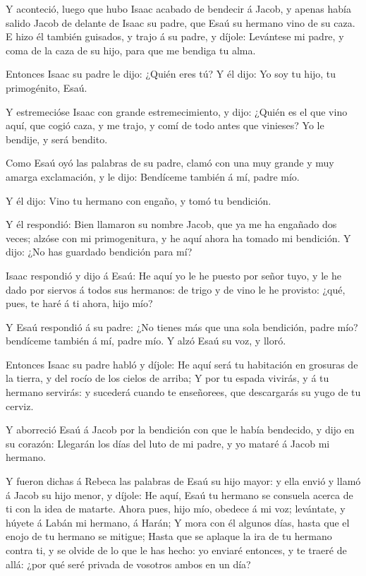  Y aconteció, luego que hubo Isaac acabado de bendecir á
Jacob, y apenas había salido Jacob de delante de Isaac su padre, que
Esaú su hermano vino de su caza.  E hizo él también
guisados, y trajo á su padre, y díjole: Levántese mi padre, y coma de la
caza de su hijo, para que me bendiga tu alma.

 Entonces Isaac su padre le dijo: ¿Quién eres tú? Y él
dijo: Yo soy tu hijo, tu primogénito, Esaú.

 Y estremecióse Isaac con grande estremecimiento, y dijo:
¿Quién es el que vino aquí, que cogió caza, y me trajo, y comí de todo
antes que vinieses? Yo le bendije, y será bendito.

 Como Esaú oyó las palabras de su padre, clamó con una muy
grande y muy amarga exclamación, y le dijo: Bendíceme también á mí,
padre mío.

 Y él dijo: Vino tu hermano con engaño, y tomó tu
bendición.

 Y él respondió: Bien llamaron su nombre Jacob, que ya me
ha engañado dos veces; alzóse con mi primogenitura, y he aquí ahora ha
tomado mi bendición. Y dijo: ¿No has guardado bendición para mí?

 Isaac respondió y dijo á Esaú: He aquí yo le he puesto por
señor tuyo, y le he dado por siervos á todos sus hermanos: de trigo y de
vino le he provisto: ¿qué, pues, te haré á ti ahora, hijo mío?

 Y Esaú respondió á su padre: ¿No tienes más que una sola
bendición, padre mío? bendíceme también á mí, padre mío. Y alzó Esaú su
voz, y lloró.

 Entonces Isaac su padre habló y díjole: He aquí será tu
habitación en grosuras de la tierra, y del rocío de los cielos de
arriba;  Y por tu espada vivirás, y á tu hermano servirás:
y sucederá cuando te enseñorees, que descargarás su yugo de tu cerviz.

 Y aborreció Esaú á Jacob por la bendición con que le había
bendecido, y dijo en su corazón: Llegarán los días del luto de mi padre,
y yo mataré á Jacob mi hermano.

 Y fueron dichas á Rebeca las palabras de Esaú su hijo
mayor: y ella envió y llamó á Jacob su hijo menor, y díjole: He aquí,
Esaú tu hermano se consuela acerca de ti con la idea de matarte.
 Ahora pues, hijo mío, obedece á mi voz; levántate, y
húyete á Labán mi hermano, á Harán;  Y mora con él algunos
días, hasta que el enojo de tu hermano se mitigue;  Hasta
que se aplaque la ira de tu hermano contra ti, y se olvide de lo que le
has hecho: yo enviaré entonces, y te traeré de allá: ¿por qué seré
privada de vosotros ambos en un día?

